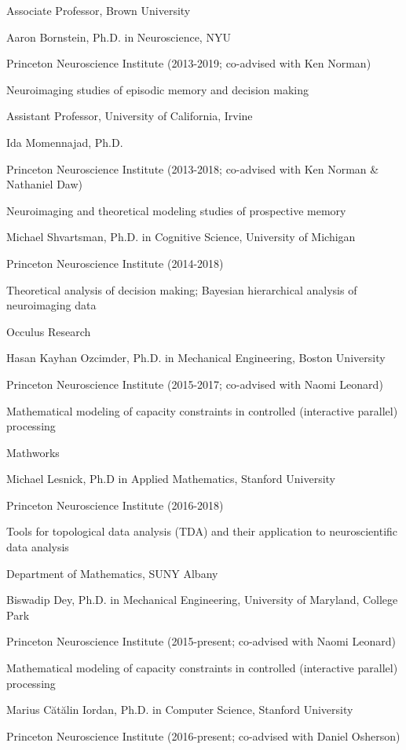 \documentclass[10 pt]{article}
\begin{document}
Associate Professor, Brown University
    \medskip

Aaron Bornstein, Ph.D. in Neuroscience, NYU

Princeton Neuroscience Institute (2013-2019; co-advised with Ken Norman)

Neuroimaging studies of episodic memory and decision making

Assistant Professor, University of California, Irvine
    \medskip

Ida Momennajad, Ph.D.

Princeton Neuroscience Institute (2013-2018; co-advised with Ken Norman \& Nathaniel Daw)

Neuroimaging and theoretical modeling studies of prospective memory
    \medskip

Michael Shvartsman, Ph.D. in Cognitive Science, University of Michigan

Princeton Neuroscience Institute (2014-2018)

Theoretical analysis of decision making; Bayesian hierarchical analysis of neuroimaging data

Occulus Research
    \medskip

Hasan Kayhan Ozcimder, Ph.D. in Mechanical Engineering, Boston University

Princeton Neuroscience Institute (2015-2017; co-advised with Naomi Leonard)

Mathematical modeling of capacity constraints in controlled (interactive parallel) processing

Mathworks
    \medskip

Michael Lesnick, Ph.D in Applied Mathematics, Stanford University

Princeton Neuroscience Institute (2016-2018)

Tools for topological data analysis (TDA) and their application to neuroscientific data analysis

Department of Mathematics, SUNY Albany
    \medskip

Biswadip Dey, Ph.D. in Mechanical Engineering, University of Maryland, College Park

Princeton Neuroscience Institute (2015-present; co-advised with Naomi Leonard)

Mathematical modeling of capacity constraints in controlled (interactive parallel) processing
    \medskip

Marius Cătălin Iordan, Ph.D. in Computer Science, Stanford University

Princeton Neuroscience Institute (2016-present; co-advised with Daniel Osherson)
\end{document}
